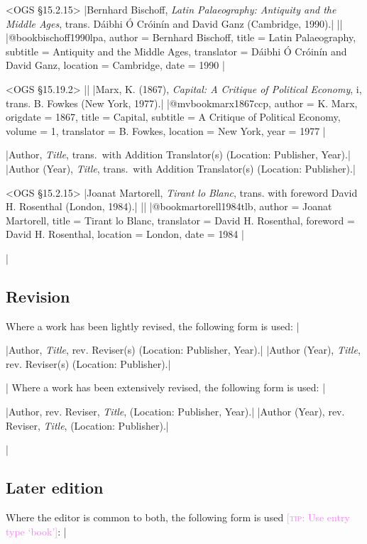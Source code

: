 \documentclass[extrafontsizes,11pt,a4paper,oneside]{memoir}
\newcommand*{\lit}[1]{\textsf{#1}}
\newcommand*{\code}[1]{`\textsf{#1}'}
\newcommand*{\aside}[1]{\textcolor{violet}{[\textsc{tip:} #1]}}
\begin{document}
\bibexample<OGS \S15.2.15>
|Bernhard Bischoff, \emph{Latin Palaeography: Antiquity and the Middle Ages}, trans. Dáibhi Ó Cróinín and David Ganz (Cambridge, 1990).|%
||%
|@book{bischoff1990lpa,
  author = {Bernhard Bischoff},
  title = {Latin Palaeography},
  subtitle = {Antiquity and the Middle Ages},
  translator = {Dáibhi Ó Cróinín and David Ganz},
  location = {Cambridge},
  date = {1990}
}|

\bibexample<OGS \S15.19.2>
||%
|Marx, K. (1867), \emph{Capital: A Critique of Political Economy}, i, trans. B. Fowkes (New York, 1977).|%
|@mvbook{marx1867ccp,
  author = {K. Marx},
  origdate = {1867},
  title = {Capital},
  subtitle = {A Critique of Political Economy},
  volume = {1},
  translator = {B. Fowkes},
  location = {New York},
  year = {1977}
}|

\specs
|Author, \emph{Title}, \lit{trans.\ with} Addition Translator(s) (Location: Publisher, Year).|%
|Author (Year), \emph{Title}, \lit{trans.\ with} Addition Translator(s) (Location: Publisher).|

\bibexample<OGS \S15.2.15>
|Joanat Martorell, \emph{Tirant lo Blanc}, trans. with foreword David H. Rosenthal (London, 1984).|%
||%
|@book{martorell1984tlb,
  author = {Joanat Martorell},
  title = {Tirant lo Blanc},
  translator = {David H. Rosenthal},
  foreword = {David H. Rosenthal},
  location = {London},
  date = {1984}
}|

\todoc|
\subsection{Revision}

Where a work has been lightly revised, the following form is used:
|

\specs
|Author, \emph{Title}, \lit{rev.} Reviser(s) (Location: Publisher, Year).|%
|Author (Year), \emph{Title}, \lit{rev.} Reviser(s) (Location: Publisher).|%

\todoc|
Where a work has been extensively revised, the following form is used:
|

\specs
|Author, \lit{rev.} Reviser, \emph{Title}, (Location: Publisher, Year).|%
|Author (Year), \lit{rev.} Reviser, \emph{Title}, (Location: Publisher).|

\todoc|
\subsection{Later edition}

Where the editor is common to both, the following form is used \aside{Use entry type \code{book}}:
|
\end{document}

